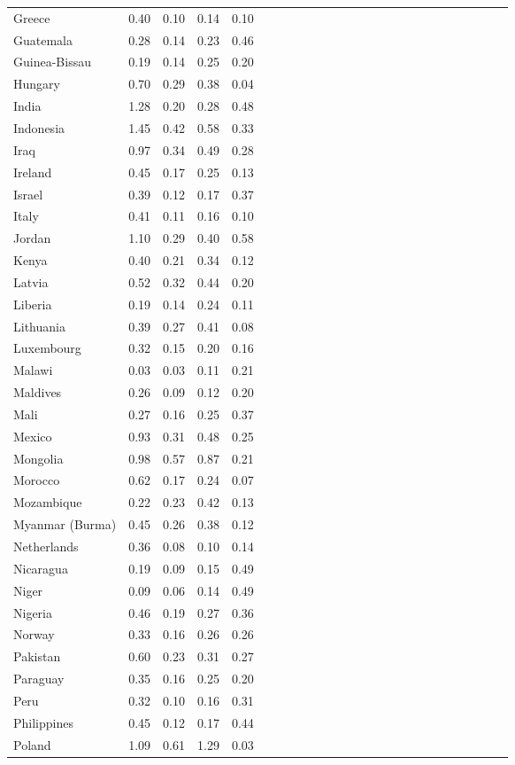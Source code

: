 \begin{ThreePartTable}
\begin{longtable}[t]{l|r|rrrl|r|rrrl|r|rrrl|r|rrrl|r|rrr}
Greece & 0.40 & 0.10 & 0.14 & 0.10\\
Guatemala & 0.28 & 0.14 & 0.23 & 0.46\\
Guinea-Bissau & 0.19 & 0.14 & 0.25 & 0.20\\
Hungary & 0.70 & 0.29 & 0.38 & 0.04\\
India & 1.28 & 0.20 & 0.28 & 0.48\\
Indonesia & 1.45 & 0.42 & 0.58 & 0.33\\
Iraq & 0.97 & 0.34 & 0.49 & 0.28\\
Ireland & 0.45 & 0.17 & 0.25 & 0.13\\
Israel & 0.39 & 0.12 & 0.17 & 0.37\\
Italy & 0.41 & 0.11 & 0.16 & 0.10\\
Jordan & 1.10 & 0.29 & 0.40 & 0.58\\
Kenya & 0.40 & 0.21 & 0.34 & 0.12\\
Latvia & 0.52 & 0.32 & 0.44 & 0.20\\
Liberia & 0.19 & 0.14 & 0.24 & 0.11\\
Lithuania & 0.39 & 0.27 & 0.41 & 0.08\\
Luxembourg & 0.32 & 0.15 & 0.20 & 0.16\\
Malawi & 0.03 & 0.03 & 0.11 & 0.21\\
Maldives & 0.26 & 0.09 & 0.12 & 0.20\\
Mali & 0.27 & 0.16 & 0.25 & 0.37\\
Mexico & 0.93 & 0.31 & 0.48 & 0.25\\
Mongolia & 0.98 & 0.57 & 0.87 & 0.21\\
Morocco & 0.62 & 0.17 & 0.24 & 0.07\\
Mozambique & 0.22 & 0.23 & 0.42 & 0.13\\
Myanmar (Burma) & 0.45 & 0.26 & 0.38 & 0.12\\
Netherlands & 0.36 & 0.08 & 0.10 & 0.14\\
Nicaragua & 0.19 & 0.09 & 0.15 & 0.49\\
Niger & 0.09 & 0.06 & 0.14 & 0.49\\
Nigeria & 0.46 & 0.19 & 0.27 & 0.36\\
Norway & 0.33 & 0.16 & 0.26 & 0.26\\
Pakistan & 0.60 & 0.23 & 0.31 & 0.27\\
Paraguay & 0.35 & 0.16 & 0.25 & 0.20\\
Peru & 0.32 & 0.10 & 0.16 & 0.31\\
Philippines & 0.45 & 0.12 & 0.17 & 0.44\\
Poland & 1.09 & 0.61 & 1.29 & 0.03\\

\end{longtable}
\end{ThreePartTable}
